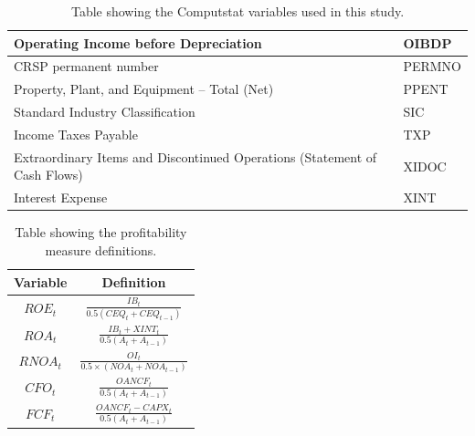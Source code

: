 {\begin{table}[htb!]
\begin{tabular}{|l|l|}
Operating Income before Depreciation                                       & OIBDP         \\ \hline
CRSP permanent number                                                      & PERMNO        \\ \hline
Property, Plant, and Equipment – Total (Net)                               & PPENT         \\ \hline
Standard Industry Classification                                           & SIC           \\ \hline
Income Taxes Payable                                                       & TXP           \\ \hline
Extraordinary Items and Discontinued Operations (Statement of Cash Flows)  & XIDOC         \\ \hline
Interest Expense                                                           & XINT          \\ \hline
\end{tabular}
\caption{Table showing the Computstat variables used in this study.}
\label{tab:CompustatVariables}
\end{table}

{\renewcommand{\arraystretch}{2}
\begin{table}[htb!]
\centering
\begin{tabular}{|c|c|}
\hline
\textbf{Variable} & \textbf{Definition}                           \\ \hline
$ROE_t$           & $\frac{IB_t}{0.5(CEQ_t + CEQ_{t-1})}$         \\ \hline
$ROA_t$           & $\frac{IB_t + XINT_t}{0.5(A_t + A_{t-1})}$    \\ \hline
$RNOA_t$          & $\frac{OI_t}{0.5 \times (NOA_t + NOA_{t-1})}$ \\ \hline
$CFO_t$           & $\frac{OANCF_t}{0.5(A_t + A_{t-1})}$          \\ \hline
$FCF_t$           & $\frac{OANCF_t - CAPX_t}{0.5(A_t + A_{t-1})}$ \\ \hline
\end{tabular}
\caption{Table showing the profitability measure definitions.}
\label{tab:ProfitMeasures} 

\end{table}


}}
